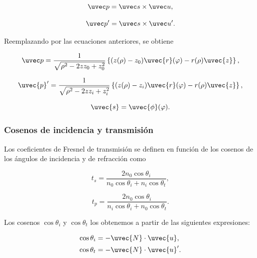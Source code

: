 \begin{equation}
    \uvec p
    =
    \uvec s \times \uvec u,
    \label{eq:p_hat_def_app}
\end{equation}

\begin{equation}
    \uvec p'
    =
    \uvec s \times \uvec u'.
    \label{eq:p_prime_hat_def}
\end{equation}

Reemplazando por las ecuaciones anteriores, se obtiene

\begin{equation}
  \uvec p
  =
  \frac{1}{\sqrt{\rho^2 - 2zz_0 + z_0^2}}
  \left\{
  (z(\rho) - z_0)\uvec{r}(\varphi)
  -
  r(\rho)\uvec{z}
  \right\},
  \label{eq:p_mode_ovoid}
\end{equation}

\begin{equation}
  \uvec{p}'
  =
  \frac{1}{\sqrt{\rho^2 - 2zz_i + z_i^2}}
  \left\{
  (z(\rho) - z_i)\uvec{r}(\varphi)
  -
  r(\rho)\uvec{z}
  \right\},
  \label{eq:p_prime_mode_ovoid}
\end{equation}

\begin{equation}
  \uvec{s}
  =
  \uvec{\phi}(\varphi).
  \label{eq:s_mode_ovoid}
\end{equation}

\subsubsection{Cosenos de incidencia y transmisión}

Los coeficientes de Fresnel de transmisión se definen en función de los cosenos de los ángulos de incidencia y de refracción como

\begin{equation}
t_s
=
\frac{2 n_0 \cos \theta_i}
{n_0 \cos \theta_i + n_i \cos \theta_t},
\label{eq:ts_app}
\end{equation}

\begin{equation}
t_p
=
\frac{2 n_0 \cos \theta_i}
{n_i \cos \theta_i + n_0 \cos \theta_t}.
\label{eq:tp_app}
\end{equation}

Los cosenos $\cos\theta_i$ y $\cos\theta_t$ los obtenemos a partir de las siguientes expresiones:

\begin{align}
  \cos\theta_i &= -\uvec{N} \cdot \uvec{u},
  \\
  \cos\theta_t &= -\uvec{N} \cdot \uvec{u}'.
\end{align}

